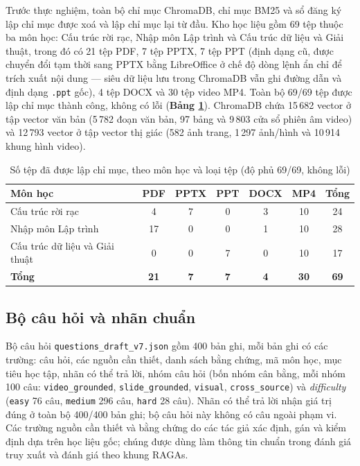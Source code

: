 Trước thực nghiệm, toàn bộ chỉ mục ChromaDB, chỉ mục BM25 và sổ đăng ký lập chỉ mục được xoá và lập chỉ mục lại từ đầu. Kho học liệu gồm 69 tệp thuộc ba môn học: Cấu trúc rời rạc, Nhập môn Lập trình và Cấu trúc dữ liệu và Giải thuật, trong đó có 21 tệp PDF, 7 tệp PPTX, 7 tệp PPT (định dạng cũ, được chuyển đổi tạm thời sang PPTX bằng LibreOffice ở chế độ dòng lệnh ẩn chỉ để trích xuất nội dung — siêu dữ liệu lưu trong ChromaDB vẫn ghi đường dẫn và định dạng \texttt{.ppt} gốc), 4 tệp DOCX và 30 tệp video MP4. Toàn bộ 69/69 tệp được lập chỉ mục thành công, không có lỗi (\textbf{Bảng \ref{tab:indexed-v7}}). ChromaDB chứa 15\,682 vector ở tập vector văn bản (5\,782 đoạn văn bản, 97 bảng và 9\,803 cửa sổ phiên âm video) và 12\,793 vector ở tập vector thị giác (582 ảnh trang, 1\,297 ảnh/hình và 10\,914 khung hình video).

\begin{table}[ht]
    \centering
    \caption{Số tệp đã được lập chỉ mục, theo môn học và loại tệp (độ phủ 69/69, không lỗi)}
    \label{tab:indexed-v7}
    \begin{tabular}{|l|c|c|c|c|c|c|}
        \hline
        \textbf{Môn học}               & \textbf{PDF} & \textbf{PPTX} & \textbf{PPT} & \textbf{DOCX} & \textbf{MP4} & \textbf{Tổng} \\
        \hline
        Cấu trúc rời rạc               & 4            & 7             & 0            & 3             & 10           & 24            \\
        \hline
        Nhập môn Lập trình             & 17           & 0             & 0            & 1             & 10           & 28            \\
        \hline
        Cấu trúc dữ liệu và Giải thuật & 0            & 0             & 7            & 0             & 10           & 17            \\
        \hline
        \textbf{Tổng}                  & \textbf{21}  & \textbf{7}    & \textbf{7}   & \textbf{4}    & \textbf{30}  & \textbf{69}   \\
        \hline
    \end{tabular}
\end{table}

\subsection{Bộ câu hỏi và nhãn chuẩn}

Bộ câu hỏi \texttt{questions\_draft\_v7.json} gồm 400 bản ghi, mỗi bản ghi có các trường: câu hỏi, các nguồn cần thiết, danh sách bằng chứng, mã môn học, mục tiêu học tập, nhãn có thể trả lời, nhóm câu hỏi (bốn nhóm cân bằng, mỗi nhóm 100 câu: \texttt{video\_grounded}, \texttt{slide\_grounded}, \texttt{visual}, \texttt{cross\_source}) và \textit{difficulty} (\texttt{easy} 76 câu, \texttt{medium} 296 câu, \texttt{hard} 28 câu). Nhãn có thể trả lời nhận giá trị đúng ở toàn bộ 400/400 bản ghi; bộ câu hỏi này không có câu ngoài phạm vi. Các trường nguồn cần thiết và bằng chứng do các tác giả xác định, gán và kiểm định dựa trên học liệu gốc; chúng được dùng làm thông tin chuẩn trong đánh giá truy xuất và đánh giá theo khung RAGAs.

